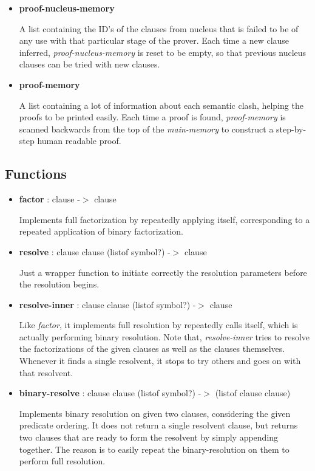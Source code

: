 \documentclass[11pt]{report}
\begin{document}
\begin{appendices}
\begin{itemize}
 \item \textbf{proof-nucleus-memory}

A list containing the ID's of the clauses from nucleus that is failed to be of any use with that particular stage of the prover. Each time a new clause inferred, \textit{proof-nucleus-memory} is reset to be empty, so that previous nucleus clauses can be tried with new clauses.

 \item \textbf{proof-memory}

A list containing a lot of information about each semantic clash, helping the proofs to be printed easily. Each time a proof is found, \textit{proof-memory} is scanned backwards from the top of the \textit{main-memory} to construct a step-by-step human readable proof.
\end{itemize}

\subsection{Functions}

\begin{itemize}
 \item \textbf{factor} : clause -$>$ clause

Implements full factorization by repeatedly applying itself, corresponding to a repeated application of binary factorization.

 \item \textbf{resolve} : clause clause (listof symbol?) -$>$ clause

Just a wrapper function to initiate correctly the resolution parameters before the resolution begins.

 \item \textbf{resolve-inner} : clause clause (listof symbol?) -$>$ clause

Like \textit{factor}, it implements full resolution by repeatedly calls itself, which is actually performing binary resolution. Note that, \textit{resolve-inner} tries to resolve the factorizations of the given clauses as well as the clauses themselves. Whenever it finds a single resolvent, it stops to try others and goes on with that resolvent.

 \item \textbf{binary-resolve} : clause clause (listof symbol?) -$>$ (listof clause clause)

Implements binary resolution on given two clauses, considering the given predicate ordering. It does not return a single resolvent clause, but returns two clauses that are ready to form the resolvent by simply appending together. The reason is to easily repeat the binary-resolution on them to perform full resolution.


\end{itemize}
\end{appendices}
\end{document}
